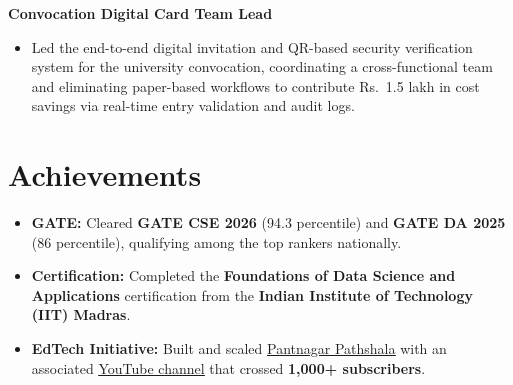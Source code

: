 \documentclass[letterpaper,8pt]{article}
\begin{document}
\textbf{Convocation Digital Card Team Lead}
\begin{itemize}
    \item Led the end-to-end digital invitation and QR-based security verification system for the university convocation, coordinating a cross-functional team and eliminating paper-based workflows to contribute Rs.~1.5 lakh in cost savings via real-time entry validation and audit logs.
\end{itemize}

\vspace{-16pt}

\section{Achievements}

\begin{itemize}
    \item \textbf{GATE:} Cleared \textbf{GATE CSE 2026} (94.3 percentile) and \textbf{GATE DA 2025} (86 percentile), qualifying among the top rankers nationally.
    \item \textbf{Certification:} Completed the \textbf{Foundations of Data Science and Applications} certification from the \textbf{Indian Institute of Technology (IIT) Madras}.
    \item \textbf{EdTech Initiative:} Built and scaled
    \href{https://pantnagar-pathshala.vercel.app/}{\color{linkblue}\underline{Pantnagar Pathshala}} with an associated
    \href{https://www.youtube.com/@dipeshmaindolia}{\color{linkblue}\underline{YouTube channel}} that crossed
    \textbf{1,000+ subscribers}.
\end{itemize}
\end{document}
